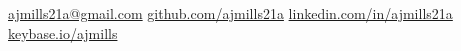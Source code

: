 
\nobreakvspace{0.3em}  %

\noindent\href{mailto:ajmills21a@gmail.com}{ajmills21a\mbox{}@\mbox{}gmail.com}\sbull
\href{https://github.com/ajmills21a}{github.com/ajmills21a}\sbull
\href{https://www.linkedin.com/in/ajmills21a/}{linkedin.com/in/ajmills21a}\sbull
\href{https://keybase.io/ajmills}{keybase.io/ajmills}

\spacedhrule{0.9em}{-0.4em}  %